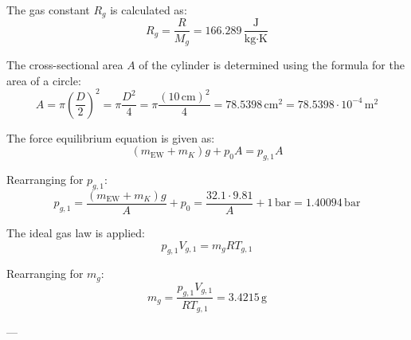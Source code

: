 The gas constant \( R_g \) is calculated as:  
\[
R_g = \frac{R}{M_g} = 166.289 \, \frac{\text{J}}{\text{kg·K}}
\]

The cross-sectional area \( A \) of the cylinder is determined using the formula for the area of a circle:  
\[
A = \pi \left(\frac{D}{2}\right)^2 = \pi \frac{D^2}{4} = \pi \frac{(10 \, \text{cm})^2}{4} = 78.5398 \, \text{cm}^2 = 78.5398 \cdot 10^{-4} \, \text{m}^2
\]

The force equilibrium equation is given as:  
\[
(m_{\text{EW}} + m_K) g + p_0 A = p_{g,1} A
\]

Rearranging for \( p_{g,1} \):  
\[
p_{g,1} = \frac{(m_{\text{EW}} + m_K) g}{A} + p_0 = \frac{32.1 \cdot 9.81}{A} + 1 \, \text{bar} = 1.40094 \, \text{bar}
\]

The ideal gas law is applied:  
\[
p_{g,1} V_{g,1} = m_g R T_{g,1}
\]

Rearranging for \( m_g \):  
\[
m_g = \frac{p_{g,1} V_{g,1}}{R T_{g,1}} = 3.4215 \, \text{g}
\]

---